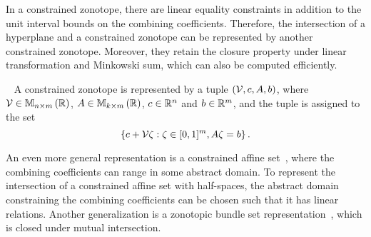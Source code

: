 In a constrained zonotope, there are linear equality constraints in
addition to the unit interval bounds on the combining coefficients.
Therefore, the intersection of a hyperplane and a constrained zonotope
can be represented by another constrained zonotope.  Moreover, they
retain the closure property under linear transformation and Minkowski
sum, which can also be computed efficiently.
%
\begin{definition}~\cite{scott2016constrained}
A constrained zonotope is represented by a tuple
$\left(\mathcal{V},c,A,b\right)$, where $\mathcal{V}\in\mathbb{M}_{n\times m}\left(\mathbb{R}\right)$,
$A\in\mathbb{M}_{k\times m}\left(\mathbb{R}\right)$, $c\in\mathbb{R}^n$ and $b\in\mathbb{R}^m$, and
the tuple is assigned to the set
%
\[\left\{c+\mathcal{V}\zeta:\zeta\in[0,1]^m,A\zeta=b\right\}.\]
%
\end{definition}
%
An even more general representation is a constrained affine
set~\cite{Ghorbal2010}, where the combining coefficients can range in some
abstract domain.  To represent the intersection of a constrained affine
set with half-spaces, the abstract domain constraining the combining
coefficients can be chosen such that it has linear relations.  Another
generalization is a zonotopic bundle set representation~\cite{althoff2011zonotope},
which is closed under mutual intersection.



